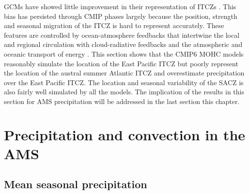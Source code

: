 GCMs have showed little improvement in their representation of ITCZs \citep{oueslati2015}. This bias has persisted through CMIP phases largely because the position, strength and seasonal migration of the ITCZ is hard to represent accurately. These features are controlled by ocean-atmosphere feedbacks that intertwine the local and regional circulation with cloud-radiative feedbacks and the atmospheric and oceanic transport of energy \citep{schneider2014,oueslati2015,byrne2016,byrne2020}. 
This section shows that the CMIP6 MOHC models reasonably simulate the location of the East Pacific ITCZ but poorly represent the location of the austral summer Atlantic ITCZ and overestimate precipitation over the East Pacific ITCZ. The location and seasonal variability of the SACZ is also fairly well simulated by all the models. The implication of the results in this section for AMS precipitation will be addressed in the last section this chapter.


\section{Precipitation and convection in the AMS}\label{sq:precip}

\subsection{Mean seasonal precipitation}

